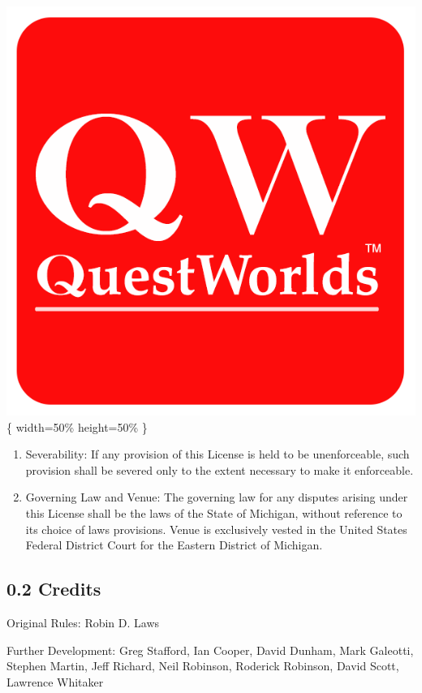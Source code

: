 \documentclass[
]{article}
\begin{document}
\includegraphics{Logos/QuestWorlds-Logo-TM.png} \{ width=50\%
height=50\% \}

\begin{enumerate}
\def\labelenumi{\arabic{enumi}.}
\setcounter{enumi}{15}
\item
  Severability: If any provision of this License is held to be
  unenforceable, such provision shall be severed only to the extent
  necessary to make it enforceable.
\item
  Governing Law and Venue: The governing law for any disputes arising
  under this License shall be the laws of the State of Michigan, without
  reference to its choice of laws provisions. Venue is exclusively
  vested in the United States Federal District Court for the Eastern
  District of Michigan.
\end{enumerate}

\hypertarget{credits}{%
\subsection{0.2 Credits}\label{credits}}

Original Rules: Robin D. Laws

Further Development: Greg Stafford, Ian Cooper, David Dunham, Mark
Galeotti, Stephen Martin, Jeff Richard, Neil Robinson, Roderick
Robinson, David Scott, Lawrence Whitaker
\end{document}
